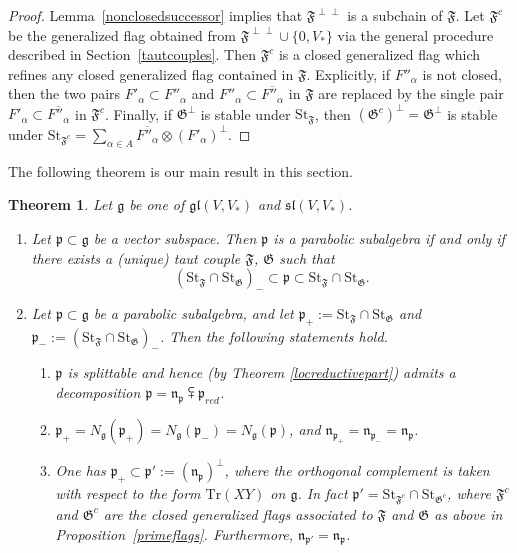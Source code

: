 \documentclass{article}
\newcommand {\tr} {\mathrm{Tr}}
\newcommand {\St} {\mathrm{St}}
\def\gl{\mathfrak {gl}}
\def\g{\mathfrak {g}}
\def\n{\mathfrak {n}}
\def\p{\mathfrak {p}}
\def\sl{\mathfrak{sl}}
\def\F{\mathfrak{F}}
\def\G{\mathfrak{G}}
\newtheorem{thm}{Theorem}[section]
\begin{document}
\begin{proof}
Lemma~\ref{nonclosedsuccessor} implies that $\F^{\perp \perp}$ is a subchain of $\F$.  Let $\F^c$ be the generalized flag obtained from $\F^{\perp \perp} \cup \{0,V_*\}$ via the general procedure described in Section~\ref{tautcouples}.  Then $\F^c$ is a closed generalized flag which refines any closed generalized flag contained in $\F$.  Explicitly, if $F''_\alpha$ is not closed, then the two pairs $F'_\alpha \subset F''_\alpha$ and $F''_\alpha \subset \overline{F''_\alpha}$ in $\F$ are replaced by the single pair $F'_\alpha \subset \overline{F''_\alpha}$ in $\F^c$.  Finally, if $\G^\perp$ is stable under $\St_\F$, then $(\G^c)^\perp = \G^\perp$ is stable under $\St_{\F^c} = \sum_{\alpha \in A} \overline{F''_\alpha} \otimes (F'_\alpha)^\perp$. 
\end{proof}


The following theorem is our main result in this section.


\begin{thm} \label{slglcharacterization}
Let $\g$ be one of $\gl(V,V_*)$ and $\sl(V,V_*)$.

\begin{enumerate}
\item Let $\p \subset \g$ be a vector subspace.  Then $\p$ is a parabolic subalgebra if and only if there exists a (unique) taut couple $\F$, $\G$ such that $$(\St_\F \cap \St_\G)_- \subset \p \subset \St_\F \cap \St_\G.$$

\item Let $\p \subset \g$ be a parabolic subalgebra, and let $\p_+ := \St_\F \cap \St_\G$ and $\p_- := (\St_\F \cap \St_\G)_- $.  Then the following statements hold.
\begin{enumerate}
\item \label{parta}
$\p$ is splittable and hence (by Theorem \ref{locreductivepart}) admits a decomposition $\p = \n_\p \subsetplus \p_{red}$.
\item \label{partb}
$\p_+ = N_\g(\p_+) = N_\g(\p_-) = N_\g(\p)$, and $\n_{\p_+} = \n_{\p_-} = \n_\p$.
\item \label{partc}
One has $\p_+ \subset \p' := (\n_\p)^\perp$, where the orthogonal complement is taken with respect to the form $\tr(XY)$ on $\g$.  In fact $\p' = \St_{\F^c} \cap \St_{\G^c}$, where $\F^c$ and $\G^c$ are the closed generalized flags associated to $\F$ and $\G$ as above in Proposition~\ref{primeflags}.  Furthermore, $\n_{\p'} = \n_\p$. 
\end{enumerate}
\end{enumerate}
\end{thm}
\end{document}
